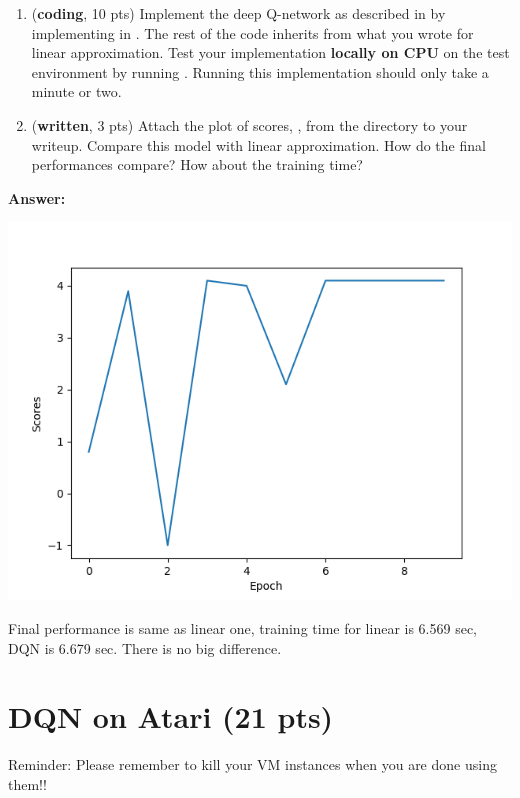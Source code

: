 \documentclass{article}
\begin{document}
\begin{enumerate}

\item (\textbf{coding}, 10 pts) Implement the deep Q-network as described in \cite{mnih2015human} by implementing   in . The rest of the code inherits from what you wrote for linear approximation. Test your implementation \textbf{locally on CPU} on the test environment by running .  Running this implementation should only take a minute or two.

\item (\textbf{written}, 3 pts) Attach the plot of scores, , from the directory  to your writeup. Compare this model with linear approximation. How do the final performances compare? How about the training time?
\end{enumerate}

\textbf{Answer:}

\includegraphics[scale=0.75]{q3_scores}

Final performance is same as linear one, training time for linear is 6.569 sec, DQN is 6.679 sec.
There is no big difference.

\section{DQN on Atari (21 pts)}

Reminder: Please remember to kill your VM instances when you are done using them!! \\
\end{document}
